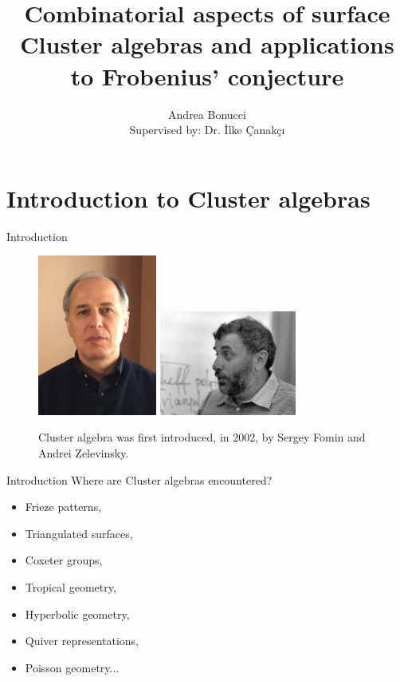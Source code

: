 \documentclass{beamer}
\title[Cluster algebras and Frobenius' conjecture]{Combinatorial aspects of surface Cluster algebras and applications to Frobenius' conjecture}
\institute[VU]{Vrije Universiteit}
\author[Andrea Bonucci]{Andrea Bonucci\\{\small Supervised by: Dr. {\.{I}}lke {\c{C}}anak{\c{c}}{\i}}}
\begin{document}
\maketitle
\section{Introduction to Cluster algebras}

\begin{frame}{Introduction} 
    \begin{figure}
        \centering
            \includegraphics[width=0.35\textwidth]{Images/fominphoto.jpg}
            \hfill
            \includegraphics[width=0.4\textwidth]{Images/zelevinskiphoto.jpeg}
        \caption{Cluster algebra was first introduced, in 2002, by Sergey Fomin and Andrei Zelevinsky.}
        \label{fig:my_label}
    \end{figure}
\end{frame}

\begin{frame}{Introduction}
    Where are Cluster algebras encountered?
    \pause
    \begin{itemize}
        \item Frieze patterns,
        \item Triangulated surfaces,
        \item Coxeter groups,
        \item Tropical geometry,
        \item Hyperbolic geometry,
        \item Quiver representations,
        \item Poisson geometry...
    \end{itemize}
\end{frame}
\end{document}
